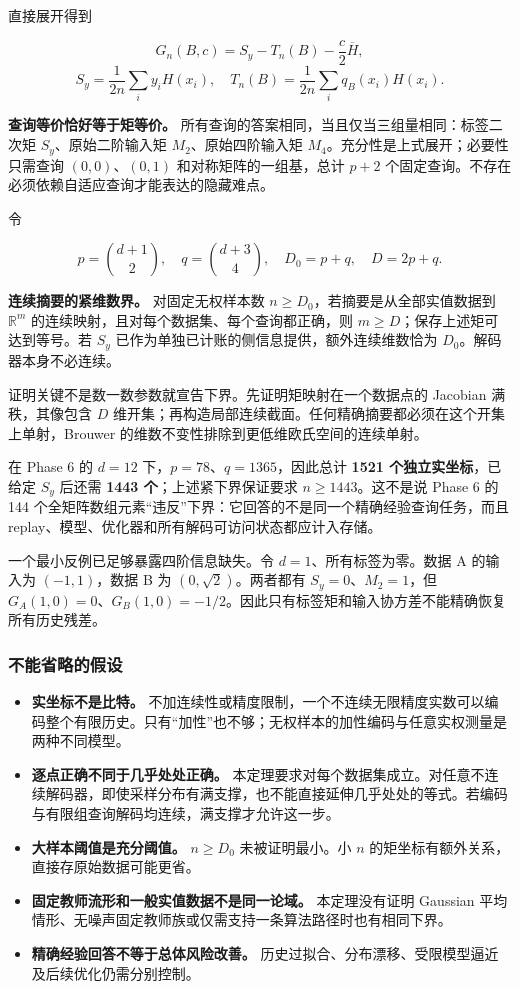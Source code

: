 \documentclass[11pt]{article}
\providecommand{\tightlist}{\setlength{\itemsep}{3pt}\setlength{\parskip}{0pt}}
\begin{document}
直接展开得到

\[G_n(B,c)=S_y-T_n(B)-\frac c2\overline H,\] \[S_y=\frac1{2n}\sum_i y_iH(x_i),\quad T_n(B)=\frac1{2n}\sum_i q_B(x_i)H(x_i).\]

\textbf{查询等价恰好等于矩等价。} 所有查询的答案相同，当且仅当三组量相同：标签二次矩 \(S_y\)、原始二阶输入矩 \(M_2\)、原始四阶输入矩 \(M_4\)。充分性是上式展开；必要性只需查询 \((0,0)\)、\((0,1)\) 和对称矩阵的一组基，总计 \(p+2\) 个固定查询。不存在必须依赖自适应查询才能表达的隐藏难点。

令

\[p=\binom{d+1}{2},\quad q=\binom{d+3}{4},\quad D_0=p+q,\quad D=2p+q.\]

\textbf{连续摘要的紧维数界。} 对固定无权样本数 \(n\ge D_0\)，若摘要是从全部实值数据到 \(\mathbb R^m\) 的连续映射，且对每个数据集、每个查询都正确，则 \(m\ge D\)；保存上述矩可达到等号。若 \(S_y\) 已作为单独已计账的侧信息提供，额外连续维数恰为 \(D_0\)。解码器本身不必连续。

证明关键不是数一数参数就宣告下界。先证明矩映射在一个数据点的 Jacobian 满秩，其像包含 \(D\) 维开集；再构造局部连续截面。任何精确摘要都必须在这个开集上单射，Brouwer 的维数不变性排除到更低维欧氏空间的连续单射。

在 Phase 6 的 \(d=12\) 下，\(p=78\)、\(q=1365\)，因此总计 \textbf{1521 个独立实坐标}，已给定 \(S_y\) 后还需 \textbf{1443 个}；上述紧下界保证要求 \(n\ge1443\)。这不是说 Phase 6 的 144 个全矩阵数组元素``违反''下界：它回答的不是同一个精确经验查询任务，而且 replay、模型、优化器和所有解码可访问状态都应计入存储。

一个最小反例已足够暴露四阶信息缺失。令 \(d=1\)、所有标签为零。数据 A 的输入为 \((-1,1)\)，数据 B 为 \((0,\sqrt2)\)。两者都有 \(S_y=0\)、\(M_2=1\)，但 \(G_A(1,0)=0\)、\(G_B(1,0)=-1/2\)。因此只有标签矩和输入协方差不能精确恢复所有历史残差。

\subsubsection{不能省略的假设}\label{ux4e0dux80fdux7701ux7565ux7684ux5047ux8bbe}

\begin{itemize}
\tightlist
\item
  \textbf{实坐标不是比特。} 不加连续性或精度限制，一个不连续无限精度实数可以编码整个有限历史。只有``加性''也不够；无权样本的加性编码与任意实权测量是两种不同模型。
\item
  \textbf{逐点正确不同于几乎处处正确。} 本定理要求对每个数据集成立。对任意不连续解码器，即使采样分布有满支撑，也不能直接延伸几乎处处的等式。若编码与有限组查询解码均连续，满支撑才允许这一步。
\item
  \textbf{大样本阈值是充分阈值。} \(n\ge D_0\) 未被证明最小。小 \(n\) 的矩坐标有额外关系，直接存原始数据可能更省。
\item
  \textbf{固定教师流形和一般实值数据不是同一论域。} 本定理没有证明 Gaussian 平均情形、无噪声固定教师族或仅需支持一条算法路径时也有相同下界。
\item
  \textbf{精确经验回答不等于总体风险改善。} 历史过拟合、分布漂移、受限模型逼近及后续优化仍需分别控制。
\end{itemize}
\end{document}
